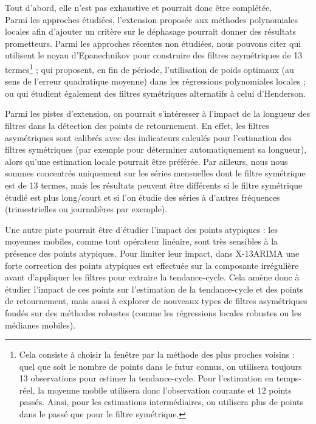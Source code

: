 \documentclass[
  12pt,
  a4paper,french]{article}
\newcommand\1{\mathds{1}}
\begin{document}
Tout d'abord, elle n'est pas exhaustive et pourrait donc être complétée.\\
Parmi les approches étudiées, l'extension proposée aux méthodes polynomiales locales afin d'ajouter un critère sur le déphasage pourrait donner des résultats prometteurs.
Parmi les approches récentes non étudiées, nous pouvons citer \textcite{vasyechko2014new} qui utilisent le noyau d'Epanechnikov pour construire des filtres asymétriques de 13 termes\footnote{
  Cela consiste à choisir la fenêtre par la méthode des plus proches voisins : quel que soit le nombre de points dans le futur connus, on utilisera toujours 13 observations pour estimer la tendance-cycle.
  Pour l'estimation en temps-réel, la moyenne mobile utilisera donc l'observation courante et 12 points passés.
  Ainsi, pour les estimations intermédiaires, on utilisera plus de points dans le passé que pour le filtre symétrique.} ; \textcite{FengSchafer2021} qui proposent, en fin de période, l'utilisation de poids optimaux (au sens de l'erreur quadratique moyenne) dans les régressions polynomiales locales ; ou \textcite{dagumBianconcini2023} qui étudient également des filtres symétriques alternatifs à celui d'Henderson.

Parmi les pistes d'extension, on pourrait s'intéresser à l'impact de la longueur des filtres dans la détection des points de retournement.
En effet, les filtres asymétriques sont calibrés avec des indicateurs calculés pour l'estimation des filtres symétriques (par exemple pour déterminer automatiquement sa longueur), alors qu'une estimation locale pourrait être préférée.
Par ailleurs, nous nous sommes concentrés uniquement sur les séries mensuelles dont le filtre symétrique est de 13 termes, mais les résultats peuvent être différents si le filtre symétrique étudié est plus long/court et si l'on étudie des séries à d'autres fréquences (trimestrielles ou journalières par exemple).

Une autre piste pourrait être d'étudier l'impact des points atypiques : les moyennes mobiles, comme tout opérateur linéaire, sont très sensibles à la présence des points atypiques.
Pour limiter leur impact, dans X-13ARIMA une forte correction des points atypiques est effectuée sur la composante irrégulière avant d'appliquer les filtres pour extraire la tendance-cycle.
Cela amène donc à étudier l'impact de ces points sur l'estimation de la tendance-cycle et des points de retournement, mais aussi à explorer de nouveaux types de filtres asymétriques fondés sur des méthodes robustes (comme les régressions locales robustes ou les médianes mobiles).
\end{document}
